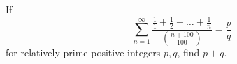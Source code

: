If
\[
\sum_{n=1}^{\infty}\frac{\frac11 + \frac12 + \dots + \frac 1n}{\binom{n+100}{100}} = \frac pq
\]
for relatively prime positive integers $p,q$, find $p+q$.
